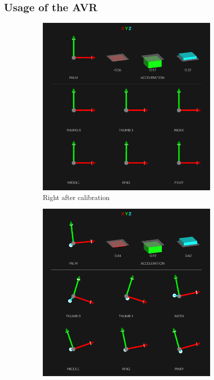 \documentclass[hyperref, bachelorofscience]{cgvpub}
\begin{document}
\subsection{Usage of the \Gls{AVR}} \label{subsec:avr}
\begin{figure}
	\centering
	\begin{subfigure}{.3\linewidth}
		\includegraphics[width=\linewidth]{../pics/glove_cal1}
		\caption{Right after calibration}
		\label{fig:glove_cal:trivial}
	\end{subfigure}
	\hfill
	\begin{subfigure}{.3\linewidth}
		\includegraphics[width=\linewidth]{../pics/glove_cal2}

\end{subfigure}
\end{figure}
\end{document}

